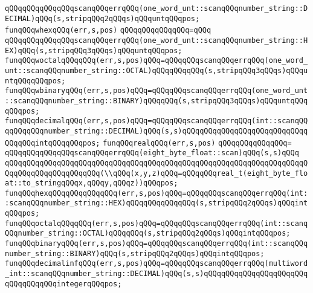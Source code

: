 \verb|qQQqqQQqqQQqqQQqscanqQQqerrqQQq(one_word_unt::scanqQQqnumber_string::DECIMAL)qQQq(s,stripqQQq2qQQqs)qQQquntqQQqpos;|\newline
\newline
\verb|funqQQqwhexqQQq(err,s,pos)|\newline
\verb|qQQqqQQqqQQqqQQq=qQQq|\newline
\verb|qQQqqQQqqQQqqQQqscanqQQqerrqQQq(one_word_unt::scanqQQqnumber_string::HEX)qQQq(s,stripqQQq3qQQqs)qQQquntqQQqpos;|\newline
\newline
\verb|funqQQqwoctalqQQqqQQq(err,s,pos)qQQq=qQQqqQQqscanqQQqerrqQQq(one_word_unt::scanqQQqnumber_string::OCTAL)qQQqqQQqqQQq(s,stripqQQq3qQQqs)qQQquntqQQqqQQqpos;|\newline
\verb|funqQQqwbinaryqQQq(err,s,pos)qQQq=qQQqqQQqscanqQQqerrqQQq(one_word_unt::scanqQQqnumber_string::BINARY)qQQqqQQq(s,stripqQQq3qQQqs)qQQquntqQQqqQQqpos;|\newline
\verb|funqQQqdecimalqQQq(err,s,pos)qQQq=qQQqqQQqscanqQQqerrqQQq(int::scanqQQqqQQqqQQqnumber_string::DECIMAL)qQQq(s,s)qQQqqQQqqQQqqQQqqQQqqQQqqQQqqQQqqQQqintqQQqqQQqpos;|\newline
\newline
\verb|funqQQqrealqQQq(err,s,pos)|\newline
\verb|qQQqqQQqqQQqqQQq=|\newline
\verb|qQQqqQQqqQQqqQQqscanqQQqerrqQQq(eight_byte_float::scan)qQQq(s,s)qQQq|\newline
\verb|qQQqqQQqqQQqqQQqqQQqqQQqqQQqqQQqqQQqqQQqqQQqqQQqqQQqqQQqqQQqqQQqqQQqqQQqqQQqqQQqqQQqqQQqqQQq(\\qQQq(x,y,z)qQQq=qQQqqQQqreal_t(eight_byte_float::to_stringqQQqx,qQQqy,qQQqz))qQQqpos;|\newline
\newline
\verb|funqQQqhexqQQqqQQqqQQqqQQq(err,s,pos)qQQq=qQQqqQQqscanqQQqerrqQQq(int::scanqQQqnumber_string::HEX)qQQqqQQqqQQqqQQq(s,stripqQQq2qQQqs)qQQqintqQQqpos;|\newline
\verb|funqQQqoctalqQQqqQQq(err,s,pos)qQQq=qQQqqQQqscanqQQqerrqQQq(int::scanqQQqnumber_string::OCTAL)qQQqqQQq(s,stripqQQq2qQQqs)qQQqintqQQqpos;|\newline
\verb|funqQQqbinaryqQQq(err,s,pos)qQQq=qQQqqQQqscanqQQqerrqQQq(int::scanqQQqnumber_string::BINARY)qQQq(s,stripqQQq2qQQqs)qQQqintqQQqpos;|\newline
\newline
\verb|funqQQqdecimalinfqQQq(err,s,pos)qQQq=qQQqqQQqscanqQQqerrqQQq(multiword_int::scanqQQqnumber_string::DECIMAL)qQQq(s,s)qQQqqQQqqQQqqQQqqQQqqQQqqQQqqQQqqQQqintegerqQQqpos;|\newline
